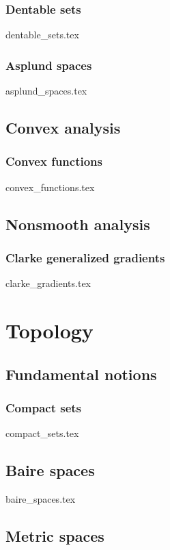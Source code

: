 \documentclass[numbers=endperiod, bibliography=totocnumbered]{scrartcl}
\begin{document}
\subsubsection{Dentable sets}\label{sec:dentable_sets}
{dentable_sets.tex}
\subsubsection{Asplund spaces}\label{sec:asplund_spaces}
{asplund_spaces.tex}

\subsection{Convex analysis}\label{sec:convex_analysis}
\subsubsection{Convex functions}\label{sec:convex_functions}
{convex_functions.tex}

\subsection{Nonsmooth analysis}\label{sec:nonsmooth_analysis}
\subsubsection{Clarke generalized gradients}\label{sec:clarke_gradients}
{clarke_gradients.tex}

\section{Topology}\label{sec:topology}
\subsection{Fundamental notions}\label{sec:topology/fundamental_notions}
\subsubsection{Compact sets}\label{sec:compact_sets}
{compact_sets.tex}
\subsection{Baire spaces}\label{sec:baire_spaces}
{baire_spaces.tex}
\subsection{Metric spaces}\label{sec:metric_spaces}
\end{document}
